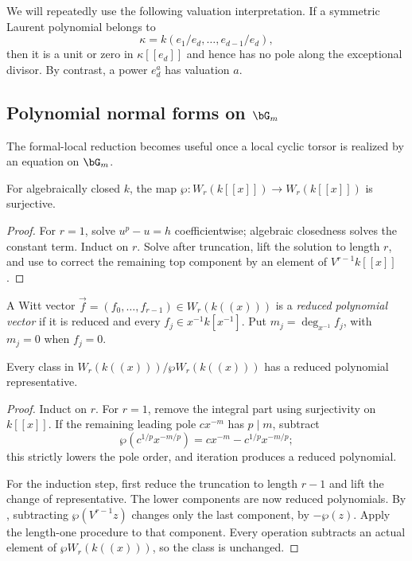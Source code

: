 We will repeatedly use the following valuation interpretation. If a symmetric
Laurent polynomial belongs to
\[
   \kappa=k(e_1/e_d,\dots,e_{d-1}/e_d),
\]
then it is a unit or zero in $\kappa[[e_d]]$ and hence has no pole along the
exceptional divisor. By contrast, a power $e_d^a$ has valuation $a$.

\subsection{\texorpdfstring{Polynomial normal forms on $\bG_m$}{Polynomial normal forms on Gm}}

The formal-local reduction becomes useful once a local cyclic torsor is
realized by an equation on $\bG_m$.

\begin{lemma}
\label{lemma:wp_surjective_on_integral_witt}
For algebraically closed $k$, the map
$\wp:W_r(k[[x]])\to W_r(k[[x]])$ is surjective.
\end{lemma}
\begin{proof}
For $r=1$, solve $u^p-u=h$ coefficientwise; algebraic closedness solves the
constant term. Induct on $r$. Solve after truncation, lift the solution to
length $r$, and use  to correct the remaining top
component by an element of $V^{r-1}k[[x]]$.
\end{proof}

\begin{definition}\label{definition:reduced_polynomial_vector}
A Witt vector $\vec f=(f_0,\dots,f_{r-1})\in W_r(k((x)))$ is a
\emph{reduced polynomial vector} if it is reduced and every
$f_j\in x^{-1}k[x^{-1}]$. Put $m_j=\deg_{x^{-1}}f_j$, with $m_j=0$ when
$f_j=0$.
\end{definition}

\begin{prop}
\label{prop:reduced_polynomial_representatives}
Every class in $W_r(k((x)))/\wp W_r(k((x)))$ has a reduced polynomial
representative.
\end{prop}
\begin{proof}
Induct on $r$. For $r=1$, remove the integral part using surjectivity on
$k[[x]]$. If the remaining leading pole $cx^{-m}$ has $p\mid m$, subtract
\[
   \wp(c^{1/p}x^{-m/p})=cx^{-m}-c^{1/p}x^{-m/p};
\]
this strictly lowers the pole order, and iteration produces a reduced
polynomial.

For the induction step, first reduce the truncation to length $r-1$ and lift
the change of representative. The lower components are now reduced
polynomials. By , subtracting
$\wp(V^{r-1}z)$ changes only the last component, by $-\wp(z)$. Apply the
length-one procedure to that component. Every operation subtracts an actual
element of $\wp W_r(k((x)))$, so the class is unchanged.
\end{proof}

